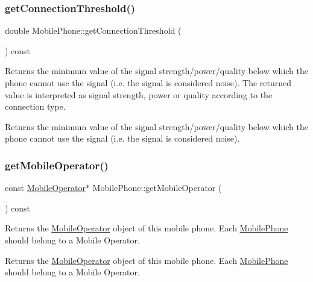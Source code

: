 \subsubsection{\texorpdfstring{get\+Connection\+Threshold()}{getConnectionThreshold()}}
{\footnotesize\ttfamily double Mobile\+Phone\+::get\+Connection\+Threshold (\begin{DoxyParamCaption}{ }\end{DoxyParamCaption}) const}

Returns the minimum value of the signal strength/power/quality below which the phone cannot use the signal (i.\+e. the signal is considered noise). The returned value is interpreted as signal strength, power or quality according to the connection type. \begin{DoxyReturn}{Returns}
the minimum value of the signal strength/power/quality below which the phone cannot use the signal (i.\+e. the signal is considered noise). 
\end{DoxyReturn}
\mbox{\label{class_mobile_phone_aba72025d08c382d8533e0cbb9166999b}} 
\subsubsection{\texorpdfstring{get\+Mobile\+Operator()}{getMobileOperator()}}
{\footnotesize\ttfamily const \hyperlink{class_mobile_operator}{Mobile\+Operator}$\ast$ Mobile\+Phone\+::get\+Mobile\+Operator (\begin{DoxyParamCaption}{ }\end{DoxyParamCaption}) const}

Returns the \hyperlink{class_mobile_operator}{Mobile\+Operator} object of this mobile phone. Each \hyperlink{class_mobile_phone}{Mobile\+Phone} should belong to a Mobile Operator. \begin{DoxyReturn}{Returns}
the \hyperlink{class_mobile_operator}{Mobile\+Operator} object of this mobile phone. Each \hyperlink{class_mobile_phone}{Mobile\+Phone} should belong to a Mobile Operator. 
\end{DoxyReturn}
\mbox{\label{class_mobile_phone_a1eeac3141baafa75ebcf26fc3a0e4068}} 
